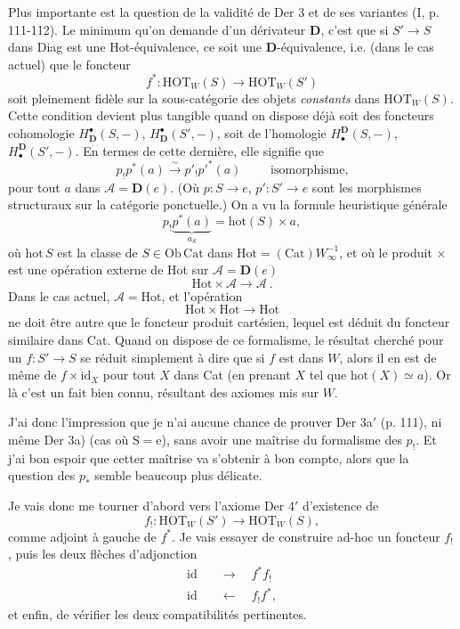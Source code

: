 \documentclass[11pt]{article}
\newcommand{\printedpage}[1]{\marginpar{\footnotesize p.~#1}}
\newcommand{\msp}[1]{\marginpar{\footnotesize [#1]}}
\newcommand{\HOT}{\mathrm{HOT}}
\newcommand{\Hot}{\mathrm{Hot}}
\newcommand{\Cat}{\mathrm{Cat}}
\newcommand{\Ob}{\mathrm{Ob}}
\newcommand{\hot}{\mathrm{hot}}
\begin{document}
Plus importante est la question de la validité de Der 3 et de ses variantes (I, p. 111-112). Le minimum qu'on demande d'un dérivateur $\mathbf{D}$, c'est que si $S'\longrightarrow S$ dans Diag est une Hot-équivalence, ce soit une $\mathbf{D}$-équivalence, i.e. (dans le cas actuel) que le foncteur
\[ f^* : \HOT_W(S) \longrightarrow \HOT_W(S') \]
soit pleinement fidèle sur la sous-catégorie des objets \textit{constants} dans $\HOT_W(S)$. Cette condition devient plus tangible quand on dispose déjà soit des foncteurs cohomologie $H^\bullet_{\mathbf{D}}(S,-)$, $H^\bullet_{\mathbf{D}}(S',-)$, soit de l'homologie $H_\bullet^{\mathbf{D}}(S,-)$, $H_\bullet^{\mathbf{D}}(S',-)$. En termes de cette dernière, elle signifie que
\[ p_!p^*(a) \xrightarrow{\sim} p'_!p'^*(a) \qquad \text{ isomorphisme,} \]
\msp{page 133}
pour tout $a$ dans $\mathcal{A}=\mathbf{D}(e)$. (Où $p:S\longrightarrow e$, $p':S'\longrightarrow e$ sont les morphismes structuraux sur la catégorie ponctuelle.) On a vu la formule heuristique générale
\[ p_!\underbrace{p^*(a)}_{a_S} = \hot(S)\times a, \]
où $\hot\,S$ est la classe de $S\in\Ob\,\Cat$ dans $\Hot=(\Cat)W_\infty^{-1}$, et où le produit $\times$ est une opération externe de Hot sur $\mathcal{A}=\mathbf{D}(e)$
\[ \Hot\times\mathcal{A} \longrightarrow \mathcal{A}\ . \]
Dans le cas actuel, $\mathcal{A}=\Hot$, et l'opération
\[ \Hot\times\Hot \longrightarrow \Hot \]
ne doit être autre que le foncteur produit cartésien, lequel est déduit du foncteur similaire dans Cat. Quand on dispose de ce formalisme, le résultat cherché pour un $f:S'\longrightarrow S$ se réduit simplement à dire que si $f$ est dans $W$, alors il en est de même de $f\times\mathrm{id}_X$ pour tout $X$ dans Cat (en prenant $X$ tel que $\hot(X)\simeq a$). Or là c'est un fait bien connu, résultant des axiomes mis sur $W$.

J'ai donc l'impression que je n'ai aucune chance de prouver Der 3a$'$ (p. 111), ni même Der 3a) (cas où $\mathrm{S}=\mathrm{e}$), sans avoir une maîtrise du formalisme des $p_!$. Et j'ai
\printedpage{82}
\msp{page 134}
bon espoir que cetter maîtrise va s'obtenir à bon compte, alors que la question des $p_*$ semble beaucoup plus délicate. %

Je vais donc me tourner d'abord vers l'axiome Der 4$'$ d'existence de
\[ f_! : \HOT_W(S') \longrightarrow \HOT_W(S), \]
comme adjoint à gauche de $f^*$. Je vais essayer de construire ad-hoc un foncteur $f_!$, puis les deux flèches d'adjonction
\[ \begin{aligned} \mathrm{id} &\quad\longrightarrow\quad f^*f_! \\ \mathrm{id} &\quad\longleftarrow\quad f_!f^*, \end{aligned} \]
et enfin, de vérifier les deux compatibilités pertinentes.
\end{document}
